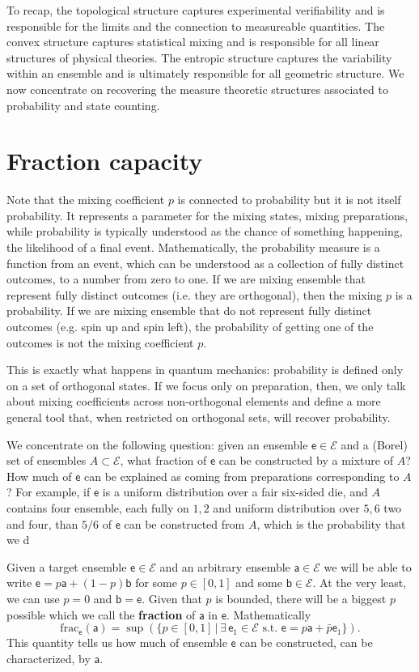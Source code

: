 \documentclass[10pt,twocolumn, nofootinbib]{revtex4-2}
\newcommand\fraction{\mathrm{frac}}
\newcommand{\ens}[1][e] {\mathsf{#1}} %
\newcommand{\Ens}[1][E] {\mathcal{#1}} %
\begin{document}
To recap, the topological structure captures experimental verifiability and is responsible for the limits and the connection to measureable quantities. The convex structure captures statistical mixing and is responsible for all linear structures of physical theories. The entropic structure captures the variability within an ensemble and is ultimately responsible for all geometric structure. We now concentrate on recovering the measure theoretic structures associated to probability and state counting.

\section{Fraction capacity}

Note that the mixing coefficient $p$ is connected to probability but it is not itself probability. It represents a parameter for the mixing states, mixing preparations, while probability is typically understood as the chance of something happening, the likelihood of a final event. Mathematically, the probability measure is a function from an event, which can be understood as a collection of fully distinct outcomes, to a number from zero to one. If we are mixing ensemble that represent fully distinct outcomes (i.e. they are orthogonal), then the mixing $p$ is a probability. If we are mixing ensemble that do not represent fully distinct outcomes (e.g. spin up and spin left), the probability of getting one of the outcomes is not the mixing coefficient $p$.

This is exactly what happens in quantum mechanics: probability is defined only on a set of orthogonal states. If we focus only on preparation, then, we only talk about mixing coefficients across non-orthogonal elements and define a more general tool that, when restricted on orthogonal sets, will recover probability.

We concentrate on the following question: given an ensemble $\ens \in \Ens$ and a (Borel) set of ensembles $A \subset \Ens$, what fraction of $\ens$ can be constructed by a mixture of $A$? How much of $\ens$ can be explained as coming from preparations corresponding to $A$? For example, if $\ens$ is a uniform distribution over a fair six-sided die, and $A$ contains four ensemble, each fully on ${1,2}$ and uniform distribution over ${5,6}$ two and four, than $5/6$ of $\ens$ can be constructed from $A$, which is the probability that we d

Given a target ensemble $\ens \in \Ens$ and an arbitrary ensemble $\ens[a] \in \Ens$ we will be able to write $\ens = p \ens[a] + (1-p) \ens[b]$ for some $p \in [0,1]$ and some $\ens[b] \in \Ens$. At the very least, we can use $p=0$ and $\ens[b] = \ens$. Given that $p$ is bounded, there will be a biggest $p$ possible which we call the \textbf{fraction} of $\ens[a]$ in $\ens$. Mathematically
\begin{equation}
	\fraction_{\ens}(\ens[a]) = \sup(\{ p \in [0,1] \, | \, \exists \, \ens_1 \in \Ens \text{ s.t. }  \ens = p \ens[a] + \bar{p} \ens_1 \}).
\end{equation}
This quantity tells us how much of ensemble $\ens$ can be constructed, can be characterized, by $\ens[a]$. 
\end{document}
